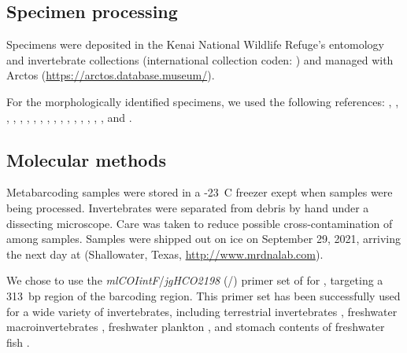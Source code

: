 \begin{multicols}{2}
\subsection{Specimen processing}

Specimens were deposited in the Kenai National Wildlife Refuge's entomology and invertebrate collections (international collection coden: ) and managed with Arctos (\url{https://arctos.database.museum/}).

For the morphologically identified specimens, we used the following references: \cite{Borroretal1989}, \cite{Brooks1957}, \cite{Burch1982}, \cite{Collet2008}, \cite{Durfee2005}, \cite{Haneyetal2013}, \cite{Hatch1953}, \cite{Herrington1962}, \cite{Kenner2009}, \cite{Mackie2007}, \cite{Marx1957}, \cite{MerrittCummins1996}, \cite{Merrittetal2008}, \cite{Reid1987}, \cite{Rileyetal2002}, \cite{Roughley2000}, \cite{Wallis1933}, and \cite{White1983}.


\subsection{Molecular methods}

Metabarcoding samples were stored in a -23~\textdegree{}C freezer exept when samples were being processed. Invertebrates were separated from debris by hand under a dissecting microscope. Care was taken to reduce possible cross-contamination of  among samples. Samples were shipped out on ice on September 29, 2021, arriving the next day at  (Shallowater, Texas, \url{http://www.mrdnalab.com}).

We chose to use the \textit{mlCOIintF}/\textit{jgHCO2198} (\-/\-) primer set of \citet{Lerayetal2013} for , targeting a 313~bp region of the   barcoding region. This primer set has been successfully used for a wide variety of invertebrates, including terrestrial invertebrates \citep{Bowseretal2020}, freshwater macroinvertebrates \citep{Hajibabaeietal2019}, freshwater plankton \citep{Yangetal2017}, and stomach contents of freshwater fish \citep{BowserBowser2020}.


\end{multicols}
